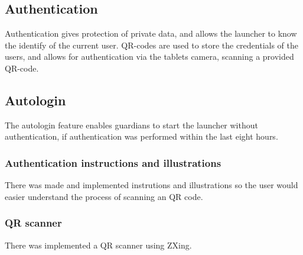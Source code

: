 \subsection{Authentication}
\label{backlog:authentication}

Authentication gives protection of private data, and allows the launcher to know the identify of the current user.
QR-codes are used to store the credentials of the users, and allows for authentication via the tablets camera, scanning a provided QR-code.

\subsection{Autologin}
\label{backlog:autologin}
The autologin feature enables guardians to start the launcher without authentication, if authentication was performed within the last eight hours.

\begin{comment}
The autologin feature enables guardians to start the launcher without authentication, if authentication was performed within the last eight hours. This is to allow guardians to easily switch between different Android launchers, without having to re-authenticate every time the GIRAF launcher is accessed. Although not an highly important feature, this feature improved the development speed in such a degree that it simply was worth spending the time implementing it.

One could argue that this feature introduces a security issue, as an attacker, if able to physically get a locked device, running the GIRAF launcher in an authenticated session, could simply reboot the device in order to get full access.

We deem that this is not critical, since a simple workaround is to always logout whenever the device is placed in an location where unauthorized users might get a hold of it.
\end{comment}


\subsubsection{Authentication instructions and illustrations}
\label{backlog:authentication_illustrations}

There was made and implemented instrutions and illustrations so the user would easier understand the process of scanning an QR code.

\subsubsection{QR scanner}
\label{backlog:QR_scanner}

There was implemented a QR scanner using ZXing.